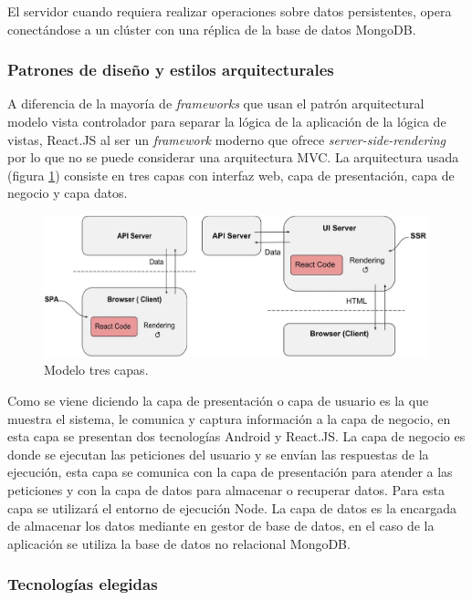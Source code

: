 \documentclass{article}
\begin{document}
El servidor cuando requiera realizar operaciones sobre datos persistentes, opera conectándose a un clúster con una réplica de la base de datos MongoDB.
 
\pagebreak
 
\subsubsection*{Patrones de diseño y estilos arquitecturales}
 
A diferencia de la mayoría de \textit{frameworks} que usan el patrón arquitectural modelo vista controlador para separar la lógica de la aplicación de la lógica de vistas, React.JS al ser un \textit{framework} moderno que ofrece \textit{server-side-rendering} por lo que no se puede considerar una arquitectura MVC.
La arquitectura usada (figura \ref{patron}) consiste en tres capas con interfaz web, capa de presentación, capa de negocio y capa datos.
 
\begin{figure}[H]
   \centering
       \includegraphics[width=0.99\textwidth]{../images/patron.jpg}
   \caption{Modelo tres capas.}
   \label{patron}
\end{figure}
 
Como se viene diciendo la capa de presentación o capa de usuario es la que muestra el sistema, le comunica y captura información a la capa de negocio, en esta capa se presentan dos tecnologías Android y React.JS.
La capa de negocio es donde se ejecutan las peticiones del usuario y se envían las respuestas de la ejecución, esta capa se comunica con la capa de presentación para atender a las peticiones y con la capa de datos para almacenar o recuperar datos. Para esta capa se utilizará el entorno de ejecución Node.
La capa de datos es la encargada de almacenar los datos mediante en gestor de base de datos, en el caso de la aplicación se utiliza la base de datos no relacional MongoDB.
 
 
\subsubsection*{Tecnologías elegidas}
 
\end{document}
